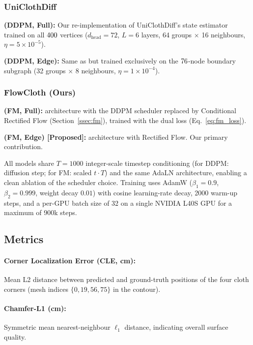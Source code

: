 \documentclass{article}
\begin{document}
\subsubsection{UniClothDiff}

\textbf{\fullddpm{} (DDPM, Full):} Our re-implementation of UniClothDiff's state estimator trained on all $400$ vertices ($d_\text{head}=72$, $L=6$ layers, 64 groups $\times$ 16 neighbours, $\eta=5\!\times\!10^{-5}$).

\textbf{\edgeddpm{} (DDPM, Edge):} Same as \fullddpm{} but trained exclusively on the $76$-node boundary subgraph (32 groups $\times$ 8 neighbours, $\eta=1\!\times\!10^{-4}$).


\subsubsection{FlowCloth (Ours)}

\textbf{\fullfm{} (FM, Full):} \fullddpm{} architecture with the DDPM scheduler replaced by Conditional Rectified Flow (Section~\ref{ssec:fm}), trained with the dual loss (Eq.~\ref{eq:fm_loss}).

\textbf{\edgefm{} (FM, Edge) [Proposed]:} \edgeddpm{} architecture with Rectified Flow. Our primary contribution.

All models share $T=1000$ integer-scale timestep conditioning (for DDPM: diffusion step; for FM: scaled $t \cdot T$) and the same AdaLN architecture, enabling a clean ablation of the scheduler choice.
Training uses AdamW ($\beta_1=0.9$, $\beta_2=0.999$, weight decay $0.01$) with cosine learning-rate decay, 2000 warm-up steps, and a per-GPU batch size of 32 on a single NVIDIA L40S GPU for a maximum of 900k steps.

\subsection{Metrics}

\paragraph{Corner Localization Error (CLE, cm):} 
Mean L2 distance between predicted and ground-truth positions of the four cloth corners (mesh indices $\{0, 19, 56, 75\}$ in the contour).

\paragraph{Chamfer-L1 (cm):}
Symmetric mean nearest-neighbour $\ell_1$ distance, indicating overall surface quality.
\end{document}
